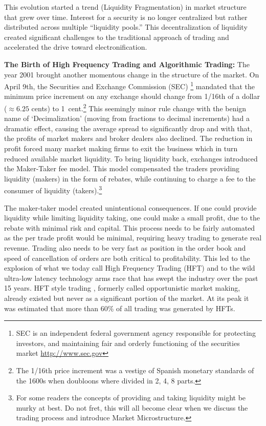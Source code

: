 This evolution started a trend (Liquidity Fragmentation) in market structure that grew over time. Interest for a security is no longer centralized but rather distributed across multiple ``liquidity pools.''  This decentralization of liquidity created significant challenges to the traditional approach of trading and accelerated the drive toward electronification. \twomedskip


\noindent\textbf{The Birth of High Frequency Trading and Algorithmic Trading:}\label{in:higheff} The year 2001 brought another momentous change in the structure of the market. On April 9th, the Securities and Exchange Commission (SEC) \footnote{SEC is an independent federal government agency responsible for protecting investors, and maintaining fair and orderly functioning of the securities market \url{http://www.sec.gov} } mandated that the minimum price increment on any exchange should change from 1/16th of a dollar ($\approx6.25$ cents) to 1~cent.\footnote{The 1/16th price increment was a vestige of Spanish monetary standards of the 1600s when doubloons where divided in 2, 4, 8 parts.} This seemingly minor rule change with the benign name of `Decimalization' (moving from fractions to decimal increments) had a dramatic effect, causing the average spread to significantly drop and with that, the profits of market makers and broker dealers also declined. The reduction in profit forced many market making firms to exit the business which in turn reduced available market liquidity. To bring liquidity back, exchanges introduced the Maker-Taker fee model.\label{in:takerfee1} This model compensated the traders providing liquidity (makers) in the form of rebates, while continuing to charge a fee to the consumer of liquidity (takers).\footnote{For some readers the concepts of providing and taking liquidity might be murky at best. Do not fret, this will all become clear when we discuss the trading process and introduce Market Microstructure.}


The maker-taker model created unintentional consequences. If one could provide liquidity while limiting liquidity taking, one could make a small profit, due to the rebate with minimal risk and capital. This process needs to be fairly automated as the per trade profit would be minimal, requiring heavy trading to generate real revenue. Trading also needs to be very fast as position in the order book and speed of cancellation of orders are both critical to profitability. This led to the explosion of what we today call High Frequency Trading (HFT) and to the wild ultra-low latency technology arms race that has swept the industry over the past 15 years. HFT style trading , formerly called opportunistic market making, already existed but never as a significant portion of the market. At its peak it was estimated that more than 60\% of all trading was generated by HFTs.


